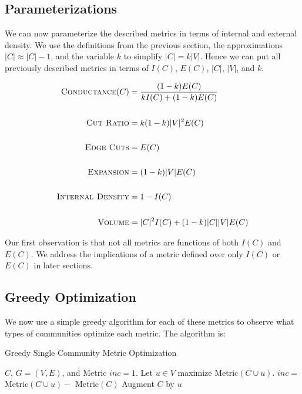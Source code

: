 \documentclass[conference]{IEEEtran}
\begin{document}
\subsection{Parameterizations}
We can now parameterize the described metrics in terms of internal and external density.  We use the definitions from the previous section, the approximations $|C| \approx |C| - 1$, and the variable $k$ to simplify $|C|  = k |V|$.  Hence we can put all previously described metrics in terms of $I(C)$, $E(C)$, $|C|$, $|V|$, and $k$.

\begin{align*}
 \text{\sc Conductance}(C) &= \frac{(1-k)E(C)}{kI(C) + (1-k)E(C)} \\
& \\
 \text{\sc Cut Ratio} &=  k(1-k)|V|^2E(C)\\
& \\
 \text{\sc Edge Cuts} &= E(C)\\
& \\
\text{\sc Expansion} &= (1- k)|V|  E(C) \\
& \\
 \text{\sc Internal Density} &=  1 - I(C) \\
& \\
 \text{\sc Volume} &= |C|^2I(C) + (1-k)|C||V|E(C)
\end{align*}

Our first observation is that not all metrics are functions of both $I(C)$ and $E(C)$.  We address the implications of a metric defined over only $I(C)$ or $E(C)$ in later sections.

\subsection{Greedy Optimization}
We now use a simple greedy algorithm for each of these metrics to observe what types of communities optimize each metric. The algorithm is:
\begin{algorithm}                      		%
\caption{Greedy Single Community Metric Optimization}     	%
\label{alg1}                           		%
\begin{algorithmic}                    	%
\REQUIRE $C$, $G=(V,E)$, and {\sc Metric}
\STATE $inc = 1.$
\STATE Let $u \in V$ maximize {\sc Metric}$(C \cup u)$.
\STATE $inc =$ {\sc Metric}$(C \cup u) - $  {\sc Metric}$(C)$
\STATE Augment $C$ by $u$
\ENDWHILE
\end{algorithmic}
\end{algorithm}
\end{document}
